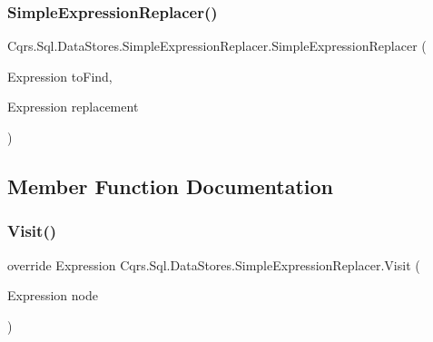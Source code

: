 \subsubsection{\texorpdfstring{Simple\+Expression\+Replacer()}{SimpleExpressionReplacer()}}
{\footnotesize\ttfamily Cqrs.\+Sql.\+Data\+Stores.\+Simple\+Expression\+Replacer.\+Simple\+Expression\+Replacer (\begin{DoxyParamCaption}\item[{Expression}]{to\+Find,  }\item[{Expression}]{replacement }\end{DoxyParamCaption})}



\subsection{Member Function Documentation}
\mbox{\label{classCqrs_1_1Sql_1_1DataStores_1_1SimpleExpressionReplacer_a362c833782ea518d3b10f74898136241}} 
\subsubsection{\texorpdfstring{Visit()}{Visit()}}
{\footnotesize\ttfamily override Expression Cqrs.\+Sql.\+Data\+Stores.\+Simple\+Expression\+Replacer.\+Visit (\begin{DoxyParamCaption}\item[{Expression}]{node }\end{DoxyParamCaption})}

